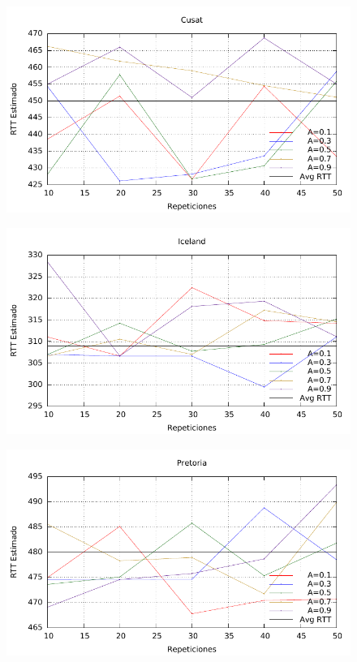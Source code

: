 \begin{figure}[htp]
 \centering
 \includegraphics[scale=0.80]{imgs/thoughput/cusat_rtt.pdf}
\end{figure}

\begin{figure}[htp]
 \centering
 \includegraphics[scale=0.80]{imgs/thoughput/hi_rtt.pdf}
\end{figure}

\begin{figure}[htp]
 \centering
 \includegraphics[scale=0.80]{imgs/thoughput/pretoria_rtt.pdf}
\end{figure}

